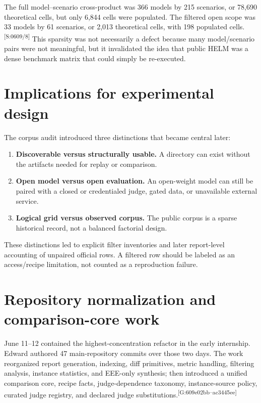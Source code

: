 \documentclass[11pt,oneside]{report}
\newcommand{\code}[1]{\texttt{\detokenize{#1}}}
\newcommand{\evmark}[1]{\allowbreak\textsuperscript{\scriptsize\textnormal{[#1]}}}
\newcommand{\slideref}[2]{\evmark{S:#1/#2}}
\newcommand{\gitref}[1]{\evmark{G:#1}}
\begin{document}
The full model--scenario cross-product was 366 models by 215 scenarios, or 78,690 theoretical cells, but only 6,844 cells were populated. The filtered open scope was 33 models by 61 scenarios, or 2,013 theoretical cells, with 198 populated cells.\slideref{0609}{8} This sparsity was not necessarily a defect because many model/scenario pairs were not meaningful, but it invalidated the idea that public HELM was a dense benchmark matrix that could simply be re-executed.

\section{Implications for experimental design}

The corpus audit introduced three distinctions that became central later:

\begin{enumerate}
  \item \textbf{Discoverable versus structurally usable.} A directory can exist without the artifacts needed for replay or comparison.
  \item \textbf{Open model versus open evaluation.} An open-weight model can still be paired with a closed or credentialed judge, gated data, or unavailable external service.
  \item \textbf{Logical grid versus observed corpus.} The public corpus is a sparse historical record, not a balanced factorial design.
\end{enumerate}

These distinctions led to explicit filter inventories and later report-level accounting of unpaired official rows. A filtered row should be labeled as an access/recipe limitation, not counted as a reproduction failure.

\section{Repository normalization and comparison-core work}

June 11--12 contained the highest-concentration refactor in the early internship. Edward authored 47 main-repository commits over those two days. The work reorganized report generation, indexing, diff primitives, metric handling, filtering analysis, instance statistics, and EEE-only synthesis; then introduced a unified \code{NormalizedDiff} comparison core, recipe facts, judge-dependence taxonomy, instance-source policy, curated judge registry, and declared judge substitutions.\gitref{609e02bb--ac3445ee}
\end{document}
